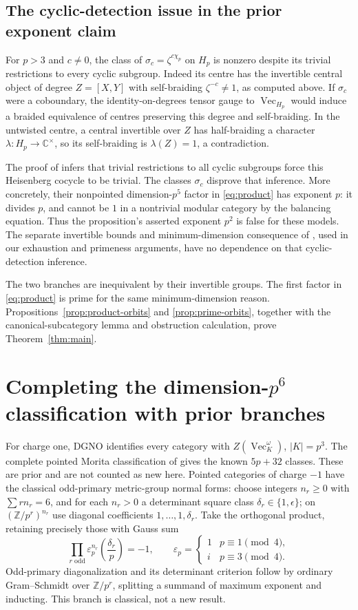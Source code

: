 \documentclass[11pt]{amsart}
\theoremstyle{definition}\newtheorem{definition}[theorem]{Definition}
\newcommand{\C}{\mathbb C}
\renewcommand{\Vec}{\operatorname{Vec}}
\begin{document}
\subsection*{The cyclic-detection issue in the prior exponent claim}
For $p>3$ and $c\ne0$, the class of $\sigma_c=\zeta^{c\chi_p}$ on $H_p$
is nonzero despite its trivial restrictions to every cyclic subgroup.
Indeed its centre has the invertible central object of degree
$Z=[X,Y]$ with self-braiding $\zeta^{-c}\ne1$, as computed above. If
$\sigma_c$ were a coboundary, the identity-on-degrees tensor gauge to
$\Vec_{H_p}$ would induce a braided equivalence of centres preserving
this degree and self-braiding. In the untwisted centre, a central invertible
over $Z$ has half-braiding a character $\lambda:H_p\to\C^\times$, so its
self-braiding is $\lambda(Z)=1$, a contradiction.

The proof of \cite[Proposition 2]{CPS} infers that trivial restrictions to
all cyclic subgroups force this Heisenberg cocycle to be trivial. The
classes $\sigma_c$ disprove that inference. More concretely, their
nonpointed dimension-$p^5$ factor in \eqref{eq:product} has exponent $p$:
it divides $p$, and cannot be $1$ in a nontrivial modular category by the
balancing equation. Thus the proposition's asserted exponent $p^2$ is
false for these models. The separate invertible bounds and minimum-dimension
consequence of \cite[Lemma 2]{CPS}, used in our exhaustion and primeness
arguments, have no dependence on that cyclic-detection inference.

The two branches are inequivalent by their invertible groups. The first factor
in \eqref{eq:product} is prime for the same minimum-dimension reason.
Propositions~\ref{prop:product-orbits} and \ref{prop:prime-orbits}, together
with the canonical-subcategory lemma and obstruction calculation, prove
Theorem~\ref{thm:main}.

\section{Completing the dimension-$p^6$ classification with prior branches}
For charge one, DGNO identifies every category with $Z(\Vec_K^\omega)$,
$|K|=p^3$. The complete pointed Morita classification of \cite{MMU} gives
the known $5p+32$ classes. These are prior and are not counted as new here.
Pointed categories of charge $-1$ have the classical odd-primary metric-group
normal forms: choose integers $n_r\ge0$ with $\sum r n_r=6$, and for each
$n_r>0$ a determinant square class $\delta_r\in\{1,\epsilon\}$; on
$(\mathbb Z/p^r)^{n_r}$ use diagonal coefficients
$1,\ldots,1,\delta_r$. Take the orthogonal product, retaining precisely
those with Gauss sum
\[
\prod_{r\text{ odd}}\varepsilon_p^{n_r}
\left(\frac{\delta_r}{p}\right)=-1,
\qquad \varepsilon_p=\begin{cases}1&p\equiv1\pmod4,\\i&p\equiv3\pmod4.\end{cases}
\]
Odd-primary diagonalization and its determinant criterion follow by ordinary
Gram--Schmidt over $\mathbb Z/p^r$, splitting a summand of maximum exponent
and inducting. This branch is classical, not a new result.
\end{document}
